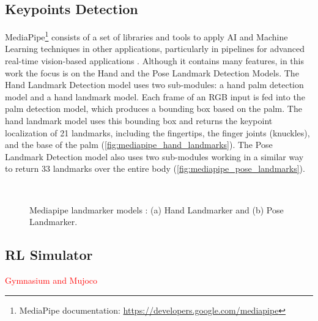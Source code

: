 \subsection{Keypoints Detection}
\label{subsection:keypointdetection}

MediaPipe\footnote{MediaPipe documentation: \url{https://developers.google.com/mediapipe}} consists of a set of libraries and tools to apply AI and Machine Learning techniques in other applications, particularly in pipelines for advanced real-time vision-based applications \cite{Lugaresi2019}. Although it contains many features, in this work the focus is on the Hand and the Pose Landmark Detection Models.
The Hand Landmark Detection model \cite{Zhang2020} uses two sub-modules: a hand palm detection model and a hand landmark model. Each frame of an RGB input is fed into the palm detection model, which produces a bounding box based on the palm. The hand landmark model uses this bounding box and returns the keypoint localization of 21 landmarks, including the fingertips, the finger joints (knuckles), and the base of the palm (\autoref{fig:mediapipe_hand_landmarks}). The Pose Landmark Detection model also uses two sub-modules working in a similar way to return 33 landmarks over the entire body (\autoref{fig:mediapipe_pose_landmarks}).

\begin{figure}[ht]
    \centering
    \begin{subfigure}[b]{0.49\textwidth}
        \caption{}
        \label{fig:mediapipe_hand_landmarks}
    \end{subfigure} \
    \begin{subfigure}[b]{0.49\textwidth}
        \caption{}
        \label{fig:mediapipe_pose_landmarks}
    \end{subfigure}
    \caption[Mediapipe landmarker models: Hand Landmarker and Pose Landmarker.]{Mediapipe landmarker models \cite{mediapipe_docs}: (a) Hand Landmarker and (b) Pose Landmarker.}
    \label{fig:mediapipe_landmarks}
\end{figure}

\subsection{RL Simulator}

\textcolor{red}{Gymnasium and Mujoco}